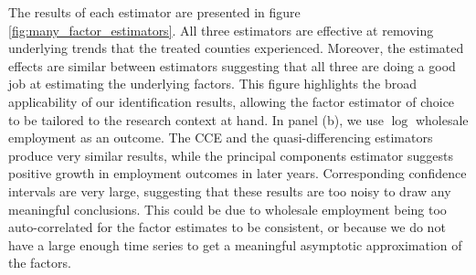 The results of each estimator are presented in figure \ref{fig:many_factor_estimators}. All three estimators are effective at removing underlying trends that the treated counties experienced. Moreover, the estimated effects are similar between estimators suggesting that all three are doing a good job at estimating the underlying factors. This figure highlights the broad applicability of our identification results, allowing the factor estimator of choice to be tailored to the research context at hand. In panel (b), we use $\log$ wholesale employment as an outcome. The CCE and the quasi-differencing estimators produce very similar results, while the principal components estimator suggests positive growth in employment outcomes in later years. Corresponding confidence intervals are very large, suggesting that these results are too noisy to draw any meaningful conclusions. This could be due to wholesale employment being too auto-correlated for the factor estimates to be consistent, or because we do not have a large enough time series to get a meaningful asymptotic approximation of the factors.

